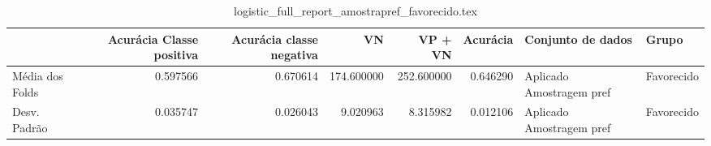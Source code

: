 \begin{table}
\centering
\caption{logistic_full_report_amostrapref_favorecido.tex}
\label{logistic_full_report_amostrapref_favorecido.tex}
\begin{tabular}{lrrrrrll}
\toprule
{} &  Acurácia Classe positiva &  Acurácia classe negativa &         VN  &    VP + VN  &  Acurácia &         Conjunto de dados &       Grupo \\
\midrule
Média dos Folds &                  0.597566 &                  0.670614 &  174.600000 &  252.600000 &  0.646290 &  Aplicado Amostragem pref &  Favorecido \\
Desv. Padrão    &                  0.035747 &                  0.026043 &    9.020963 &    8.315982 &  0.012106 &  Aplicado Amostragem pref &  Favorecido \\
\bottomrule
\end{tabular}
\end{table}
